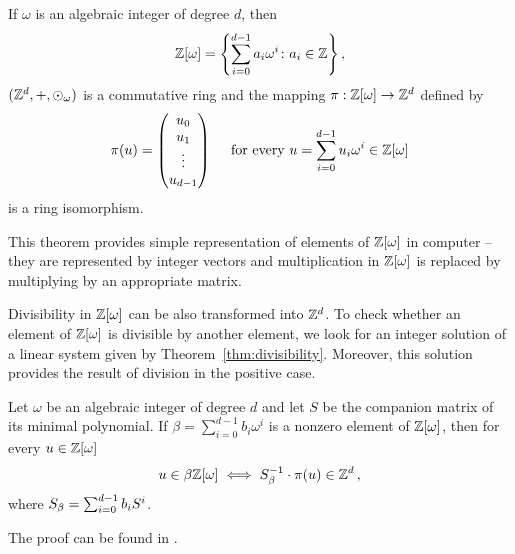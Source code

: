 \begin{thm}
\label{thm:isomorphismWithZd}
If  $\omega$ is an algebraic integer of degree $d$, then 
$$
\mathbb{Z}[\omega] =\left\{\sum_{i=0}^{d-1} a_i \omega^i \colon a_i\in\mathbb{Z} \right\},
$$ 
$(\mathbb{Z}^d,+,\odot_\omega)$ is a commutative ring and the mapping $\pi:\mathbb{Z}[\omega] \rightarrow \mathbb{Z}^{d}$ defined by 
$$
\pi(u)=\begin{pmatrix} {u}_0 \\ {u}_1 \\ \vdots \\ {u}_{d-1} \end{pmatrix} \quad \text{ for every } u=\sum_{i=0}^{d-1} u_i \omega^i \in \mathbb{Z}[\omega]
$$
is a ring isomorphism.
\end{thm}

This theorem provides simple representation of elements of $\mathbb{Z}[\omega]$ in computer -- they are represented by integer vectors and multiplication in $\mathbb{Z}[\omega]$ is replaced by multiplying by an appropriate matrix. 

Divisibility in $\mathbb{Z}[\omega]$ can be also transformed into $\mathbb{Z}^d$. To check whether an element of $\mathbb{Z}[\omega]$ is divisible by another element, we look for an integer solution of a linear system given by Theorem~\ref{thm:divisibility}. Moreover, this solution provides the result of  division in the positive case. 
\begin{thm}
\label{thm:divisibility}
Let $\omega$ be an algebraic integer of degree $d$ and let $S$ be the companion matrix of its minimal polynomial. If $\beta=\sum_{i=0}^{d-1} b_i \omega^i$ is a nonzero element of $\mathbb{Z}[\omega]$, then for every $u\in\mathbb{Z}[\omega]$
$$
u\in\beta\mathbb{Z}[\omega] \iff S_\beta^{-1}\cdot \pi(u) \in \mathbb{Z}^d\,,
$$
where $S_\beta=\sum_{i=0}^{d-1} {b}_i S^i$.
\end{thm}
The proof can be found in \cite{vu}.

